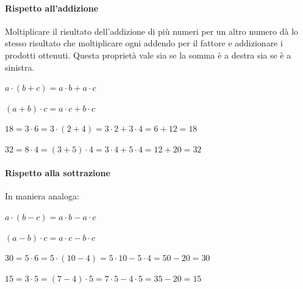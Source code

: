 \paragraph{Rispetto all'addizione}
Moltiplicare il risultato dell'addizione di più numeri per un altro numero 
dà lo stesso risultato che moltiplicare ogni addendo per il fattore e 
addizionare i prodotti ottenuti. Questa proprietà vale sia se la somma è a 
destra sia se è a sinistra.


\vspace{.5em}
\begin{minipage}{.38\textwidth}
 \(a \cdot (b+c) = a \cdot b + a \cdot c\)
 
 \((a+b) \cdot c = a \cdot c + b \cdot c\)
\end{minipage}
\hfill
\begin{minipage}{.58\textwidth}
 \(18 = 3 \cdot 6 = 3 \cdot(2+4) = 3 \cdot 2 + 3 \cdot 4 = 6 + 12 = 18\)
 
 \(32 = 8 \cdot 4 = (3+5) \cdot 4 = 3 \cdot 4 + 5 \cdot 4 = 12 + 20 = 32\)
\end{minipage}

\paragraph{Rispetto alla sottrazione}
In maniera analoga:


\vspace{.5em}
\begin{minipage}{.38\textwidth}
 \(a\cdot (b-c) = a\cdot b - a\cdot c\)
 
 \((a-b)\cdot c = a\cdot c - b\cdot c\)
\end{minipage}
\hfill
\begin{minipage}{.58\textwidth}
 \(30 = 5 \cdot 6 = 5\cdot(10-4) = 5\cdot 10 - 5\cdot 4 = 50 - 20 = 30\)
 
 \(15 = 3 \cdot 5 = (7-4) \cdot 5 = 7\cdot 5 - 4\cdot 5 = 35 - 20 = 15\)
\end{minipage}

